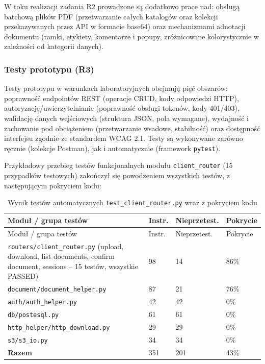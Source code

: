 W toku realizacji zadania R2 prowadzone są dodatkowo prace nad: obsługą batchową plików PDF (przetwarzanie całych katalogów oraz kolekcji przekazywanych przez API w formacie base64) oraz mechanizmami adnotacji dokumentu (ramki, etykiety, komentarze i popupy, zróżnicowane kolorystycznie w zależności od kategorii danych).

\subsubsection*{Testy prototypu (R3)}

Testy prototypu w warunkach laboratoryjnych obejmują pięć obszarów: poprawność endpointów REST (operacje CRUD, kody odpowiedzi HTTP), autoryzację/uwierzytelnianie (poprawność obsługi tokenów, kody 401/403), walidację danych wejściowych (struktura JSON, pola wymagane), wydajność i zachowanie pod obciążeniem (przetwarzanie wsadowe, stabilność) oraz dostępność interfejsu zgodnie ze standardem WCAG 2.1. Testy są wykonywane zarówno ręcznie (kolekcje Postman), jak i automatycznie (framework \texttt{pytest}).

Przykładowy przebieg testów funkcjonalnych modułu \texttt{client\_router} (15 przypadków testowych) zakończył się powodzeniem wszystkich testów, z następującym pokryciem kodu:

\begingroup
\small
\begin{longtable}{p{} p{} p{} p{}}
\caption{Wynik testów automatycznych \texttt{test\_client\_router.py} wraz z pokryciem kodu} \\
\toprule
\rowcolor{tablehead!15}
Moduł / grupa testów & Instr. & Nieprzetest. & Pokrycie \\
\midrule
\endfirsthead
\toprule
\rowcolor{tablehead!15}
Moduł / grupa testów & Instr. & Nieprzetest. & Pokrycie \\
\midrule
\endhead
\texttt{routers/client\_router.py} (upload, download, list documents, confirm document, sessions -- 15 testów, wszystkie PASSED) & 98 & 14 & 86\% \\
\texttt{document/document\_helper.py} & 87 & 21 & 76\% \\
\texttt{auth/auth\_helper.py} & 42 & 42 & 0\% \\
\texttt{db/postesql.py} & 61 & 61 & 0\% \\
\texttt{http\_helper/http\_download.py} & 29 & 29 & 0\% \\
\texttt{s3/s3\_io.py} & 34 & 34 & 0\% \\
\midrule
\textbf{Razem} & 351 & 201 & 43\% \\
\bottomrule
\end{longtable}
\endgroup


